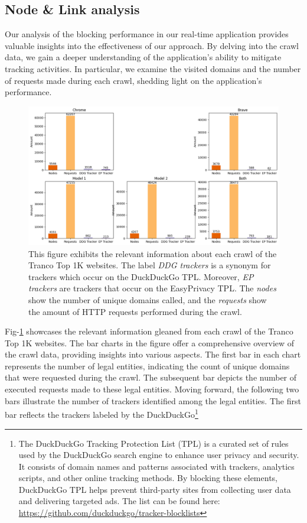 \subsection{Node \& Link analysis}

Our analysis of the blocking performance in our real-time application provides valuable insights into the effectiveness
of our approach. By delving into the crawl data, we gain a deeper understanding of the application's ability to mitigate
tracking activities. In particular, we examine the visited domains and the number of requests made during each crawl, shedding
light on the application's performance.

\begin{figure}[ht!]  
  \centering
      \includegraphics[width=\linewidth, keepaspectratio]{images/CrawlPlot.png}
  \caption{This figure exhibits the relevant information about each crawl of the Tranco Top 1K websites. The label \emph{DDG trackers}
    is a synonym for trackers which occur on the DuckDuckGo TPL. Moreover, \emph{EP trackers} are trackers that occur on the EasyPrivacy TPL. The \emph{nodes} show
  the number of unique domains called, and the \emph{requests} show the amount of HTTP requests performed during the crawl.}
  \label{fig:CrawlPlot}
\end{figure}
Fig-\ref{fig:CrawlPlot} showcases the relevant information gleaned from each crawl of the Tranco Top 1K websites. The bar charts in
the figure offer a comprehensive overview of the crawl data, providing insights into various aspects. The first bar in each
chart represents the number of legal entities, indicating the count of unique domains that were requested during the crawl.
The subsequent bar depicts the number of executed requests made to these legal entities. Moving forward, the following two bars
illustrate the number of trackers identified among the legal entities. The first bar reflects the trackers labeled by the DuckDuckGo\footnote{The DuckDuckGo Tracking Protection List (TPL) is a curated set of rules used by the DuckDuckGo search engine to enhance user privacy and security. It consists of domain names and patterns associated with trackers, analytics scripts, and other online tracking methods. By blocking these elements, DuckDuckGo TPL helps prevent third-party sites from collecting user data and delivering targeted ads. The list can be found here: \url{https://github.com/duckduckgo/tracker-blocklists}}
